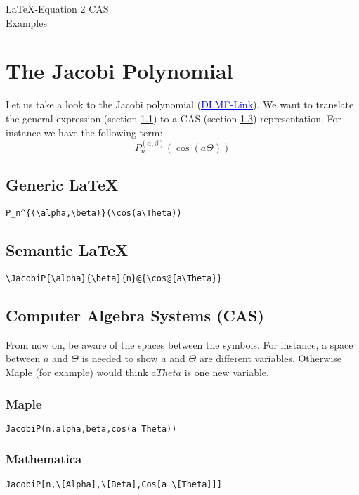 \documentclass{article}
\begin{document}
\begin{center}
    \Large
    \LaTeX-Equation 2 CAS\\[12pt]
    \large Examples
\end{center}

\section{The Jacobi Polynomial}
Let us take a look to the Jacobi polynomial (\href{http://dlmf.nist.gov/18.3\#T1.t1.r2}{\textcolor{blue}{\underline{DLMF-Link}}}). We want to translate the general expression (section \ref{sec:generic}) to a CAS (section \ref{sec:cas}) representation. For instance we have the following term:
\begin{equation}\label{eq:jacP}
    P_n^{(\alpha, \beta)}(\cos(a \Theta))
\end{equation}

\subsection{Generic \LaTeX}\label{sec:generic}
\begin{lstlisting}[mathescape]
P_n^{(\alpha,\beta)}(\cos(a\Theta))
\end{lstlisting}

\subsection{Semantic \LaTeX}\label{sec:semantic}
\begin{lstlisting}[mathescape]
\JacobiP{\alpha}{\beta}{n}@{\cos@{a\Theta}}
\end{lstlisting}

\subsection{Computer Algebra Systems (CAS)}\label{sec:cas}
From now on, be aware of the spaces between the symbols. For instance, a space between $a$ and $\Theta$ is needed to show $a$ and $\Theta$ are different variables. Otherwise Maple (for example) would think $aTheta$ is one new variable.
\subsubsection{Maple}\label{subsec:maple}
\begin{lstlisting}[mathescape]
JacobiP(n,alpha,beta,cos(a Theta))
\end{lstlisting}

\subsubsection{Mathematica}\label{subsec:mathematica}
\begin{lstlisting}[mathescape]
JacobiP[n,\[Alpha],\[Beta],Cos[a \[Theta]]]
\end{lstlisting}
\end{document}
